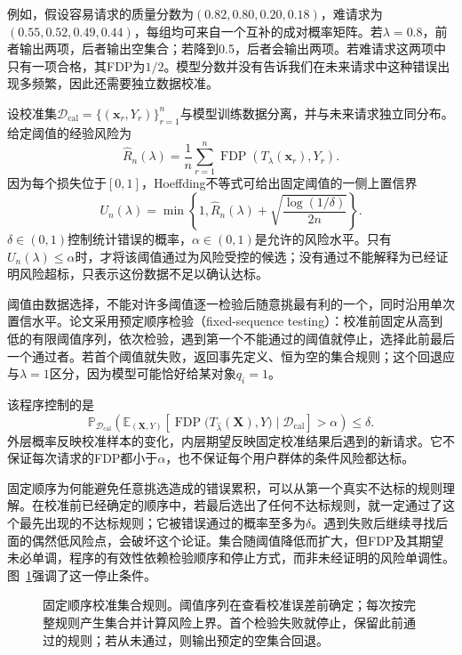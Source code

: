 例如，假设容易请求的质量分数为$(0.82,0.80,0.20,0.18)$，难请求为$(0.55,0.52,0.49,0.44)$，每组均可来自一个互补的成对概率矩阵。若$\lambda=0.8$，前者输出两项，后者输出空集合；若降到0.5，后者会输出两项。若难请求这两项中只有一项合格，其FDP为$1/2$。模型分数并没有告诉我们在未来请求中这种错误出现多频繁，因此还需要独立数据校准。

设校准集$\mathcal{D}_{\mathrm{cal}}=\{(\bm{x}_r,Y_r)\}_{r=1}^{n}$与模型训练数据分离，并与未来请求独立同分布。给定阈值的经验风险为
\[
 \widehat R_n(\lambda)=\frac1n\sum_{r=1}^{n}
   \operatorname{FDP}(T_\lambda(\bm{x}_r),Y_r).
\]
因为每个损失位于$[0,1]$，Hoeffding不等式可给出固定阈值的一侧上置信界
\begin{equation}
 U_n(\lambda)=
 \min\left\{1,\widehat R_n(\lambda)
       +\sqrt{\frac{\log(1/\delta)}{2n}}\right\}.
 \label{eq:rs-risk-upper-bound}
\end{equation}
$\delta\in(0,1)$控制统计错误的概率，$\alpha\in(0,1)$是允许的风险水平。只有$U_n(\lambda)\leq\alpha$时，才将该阈值通过为风险受控的候选；没有通过不能解释为已经证明风险超标，只表示这份数据不足以确认达标。

阈值由数据选择，不能对许多阈值逐一检验后随意挑最有利的一个，同时沿用单次置信水平。论文采用预定顺序检验（fixed-sequence testing）：校准前固定从高到低的有限阈值序列，依次检验，遇到第一个不能通过的阈值就停止，选择此前最后一个通过者。若首个阈值就失败，返回事先定义、恒为空的集合规则；这个回退应与$\lambda=1$区分，因为模型可能恰好给某对象$q_i=1$。

该程序控制的是
\begin{equation}
 \mathbb{P}_{\mathcal{D}_{\mathrm{cal}}}
 \left(
  \mathbb{E}_{(\bm{X},Y)}
   \left[
    \operatorname{FDP}
     \bigl(T_{\widehat\lambda}(\bm{X}),Y\bigr)
    \mid\mathcal{D}_{\mathrm{cal}}
   \right]>\alpha
 \right)
 \leq\delta.
 \label{eq:rs-reliability-guarantee}
\end{equation}
外层概率反映校准样本的变化，内层期望反映固定校准结果后遇到的新请求。它不保证每次请求的FDP都小于$\alpha$，也不保证每个用户群体的条件风险都达标。

固定顺序为何能避免任意挑选造成的错误累积，可以从第一个真实不达标的规则理解。在校准前已经确定的顺序中，若最后选出了任何不达标规则，就一定通过了这个最先出现的不达标规则；它被错误通过的概率至多为$\delta$。遇到失败后继续寻找后面的偶然低风险点，会破坏这个论证。集合随阈值降低而扩大，但FDP及其期望未必单调，程序的有效性依赖检验顺序和停止方式，而非未经证明的风险单调性。图~\ref{fig:rs-risk-calibration}强调了这一停止条件。

\begin{figure}[htbp]
 \centering
 
 \caption{固定顺序校准集合规则。阈值序列在查看校准误差前确定；每次按完整规则产生集合并计算风险上界。首个检验失败就停止，保留此前通过的规则；若从未通过，则输出预定的空集合回退。}
 \label{fig:rs-risk-calibration}
\end{figure}

